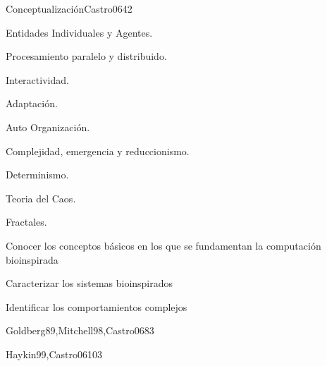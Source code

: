 \begin{syllabus}
\begin{unit}{Conceptualización}{Castro06}{4}{2}
\begin{topics}
        \item Entidades Individuales y Agentes.
        \item Procesamiento paralelo y distribuido.
        \item Interactividad.
        \item Adaptación.
        \item Auto Organización.
        \item Complejidad, emergencia y reduccionismo.
        \item Determinismo.
        \item Teoria del Caos.
        \item Fractales.
    \end{topics}

    \begin{learningoutcomes}
        \item Conocer los conceptos básicos en los que se fundamentan la computación bioinspirada
        \item Caracterizar los sistemas bioinspirados
        \item Identificar los comportamientos complejos
    \end{learningoutcomes}
\end{unit}

\begin{unit}{\ISAdvancedSearchDef}{Goldberg89,Mitchell98,Castro06}{8}{3}
     \ISAdvancedSearchAllTopics
     \ISAdvancedSearchAllObjectives
\end{unit}

\begin{unit}{\ISMachineLearningDef}{Haykin99,Castro06}{10}{3}
    \ISMachineLearningAllTopics
    \ISMachineLearningAllObjectives
\end{unit}


\end{syllabus}
